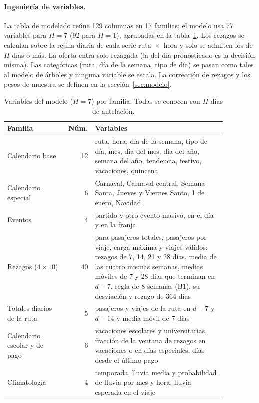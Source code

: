 \paragraph{Ingeniería de variables.}
La tabla de modelado reúne 129 columnas en 17 familias; el modelo usa 77 variables para $H = 7$ (92 para
$H = 1$), agrupadas en la tabla~\ref{tab:variables}. Los rezagos se calculan sobre la rejilla diaria de cada
serie ruta~$\times$~hora y solo se admiten los de $H$ días o más. La oferta entra solo rezagada (la del
día pronosticado es la decisión misma). Las categóricas
(ruta, día de la semana, tipo de día) se pasan como tales al modelo de árboles y ninguna variable se escala.
La corrección de rezagos y los pesos de muestra se definen en la sección~\ref{sec:modelo}.

\begin{table}[t]
  \centering\small
  \caption{Variables del modelo ($H = 7$) por familia. Todas se conocen con $H$ días de antelación.}
  \label{tab:variables}
  \begin{tabular}{@{}>{\raggedright\arraybackslash}p{0.27\linewidth} r >{\raggedright\arraybackslash}p{0.6\linewidth}@{}}
    \toprule
    Familia & Núm. & Variables \\
    \midrule
    Calendario base & 12 & ruta, hora, día de la semana, tipo de día, mes, día del mes, día del año, semana del año, tendencia, festivo, vacaciones, quincena \\
    Calendario especial & 6 & Carnaval, Carnaval central, Semana Santa, Jueves y Viernes Santo, 1 de enero, Navidad \\
    Eventos & 4 & partido y otro evento masivo, en el día y en la franja \\
    Rezagos ($4 \times 10$) & 40 & para pasajeros totales, pasajeros por viaje, carga máxima y viajes válidos: rezagos de 7, 14, 21 y 28 días, media de las cuatro mismas semanas, medias móviles de 7 y 28 días que terminan en $d-7$, regla de 8 semanas (B1), su desviación y rezago de 364 días \\
    Totales diarios de la ruta & 5 & pasajeros y viajes de la ruta en $d-7$ y $d-14$ y media móvil de 7 días \\
    Calendario escolar y de pago & 6 & vacaciones escolares y universitarias, fracción de la ventana de rezagos en vacaciones o en días especiales, días desde el último pago \\
    Climatología & 4 & temporada, lluvia media y probabilidad de lluvia por mes y hora, lluvia esperada en el viaje \\
    \bottomrule
  \end{tabular}
\end{table}

